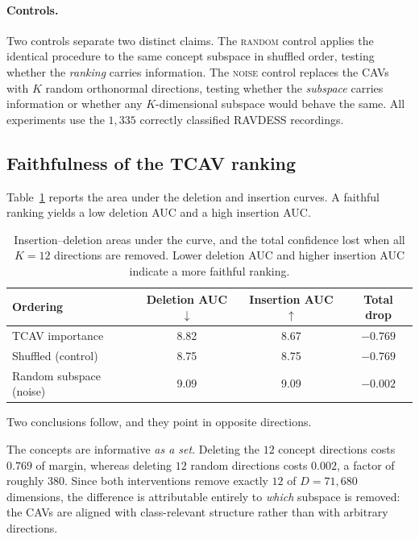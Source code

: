 \paragraph{Controls.}
Two controls separate two distinct claims. The \textsc{random} control applies
the identical procedure to the same concept subspace in shuffled order, testing
whether the \emph{ranking} carries information. The \textsc{noise} control
replaces the CAVs with $K$ random orthonormal directions, testing whether the
\emph{subspace} carries information or whether any $K$-dimensional subspace
would behave the same. All experiments use the $1{,}335$ correctly classified
RAVDESS recordings.

\subsection{Faithfulness of the TCAV ranking}
\label{sec:ablation-faithfulness}

Table~\ref{tab:ablation-auc} reports the area under the deletion and insertion
curves. A faithful ranking yields a low deletion AUC and a high insertion AUC.

\begin{table}[t]
\centering
\caption{Insertion--deletion areas under the curve, and the total confidence
lost when all $K=12$ directions are removed. Lower deletion AUC and higher
insertion AUC indicate a more faithful ranking.}
\label{tab:ablation-auc}
\begin{tabular}{lccc}
\toprule
Ordering & Deletion AUC $\downarrow$ & Insertion AUC $\uparrow$ & Total drop \\
\midrule
TCAV importance      & 8.82 & 8.67 & $-0.769$ \\
Shuffled (control)   & 8.75 & 8.75 & $-0.769$ \\
Random subspace (noise) & 9.09 & 9.09 & $-0.002$ \\
\bottomrule
\end{tabular}
\end{table}

Two conclusions follow, and they point in opposite directions.

The concepts are informative \emph{as a set}. Deleting the $12$ concept
directions costs $0.769$ of margin, whereas deleting $12$ random directions
costs $0.002$, a factor of roughly $380$. Since both interventions remove
exactly $12$ of $D=71{,}680$ dimensions, the difference is attributable
entirely to \emph{which} subspace is removed: the CAVs are aligned with
class-relevant structure rather than with arbitrary directions.

